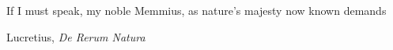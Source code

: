 

\epigraph{If I must speak, my noble Memmius, as nature's majesty now known demands}{Lucretius, \textit{De Rerum Natura}}

